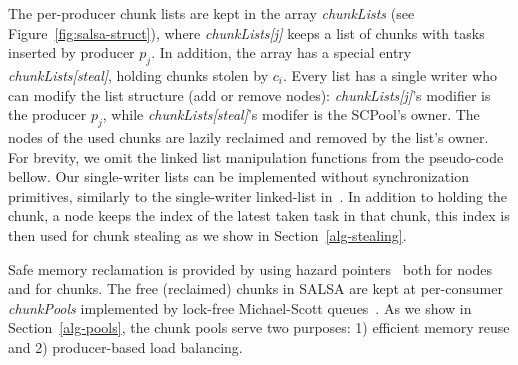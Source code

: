 The per-producer chunk lists are kept in the array \emph{chunkLists} (see Figure~\ref{fig:salsa-struct}), where \emph{chunkLists[j]} keeps a list of chunks with tasks inserted by producer $p_j$. In addition, the array has a special entry \emph{chunkLists[steal]}, holding chunks stolen by $c_i$. Every list has a single writer who can modify the list structure (add or remove nodes): \emph{chunkLists[j]}'s modifier is the producer $p_j$, while \emph{chunkLists[steal]}'s modifer is the SCPool's owner. 
The nodes of the used chunks are lazily reclaimed and removed by the list's owner. For brevity, we omit the linked list manipulation functions from the pseudo-code bellow. Our single-writer lists can be implemented without synchronization primitives, similarly to the single-writer linked-list in~\cite{Michael:2004:HPS:987524.987595}.
In addition to holding the chunk, a node keeps the index of the latest taken task in that chunk, this index is then used for chunk stealing as we show in Section~\ref{alg-stealing}. 

Safe memory reclamation is provided by using hazard pointers~\cite{Michael:2004:HPS:987524.987595} both for nodes and for chunks.
The free (reclaimed) chunks in SALSA are kept at per-consumer \emph{chunkPools} implemented by lock-free Michael-Scott queues~\cite{Michael:1996:SFP:248052.248106}. As we show in Section~\ref{alg-pools}, the chunk pools serve two purposes: 1) efficient memory reuse and 2) producer-based load balancing.  	